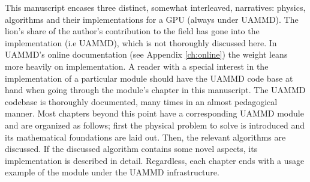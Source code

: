 \documentclass[ twoside,openright,titlepage,numbers=noenddot,%
headinclude,footinclude,cleardoublepage=empty,abstract=on,
BCOR=5mm,paper=b5,fontsize=11pt, dvipsnames
]{scrreprt}
\begin{document}
%
%
This manuscript encases three distinct, somewhat interleaved, narratives: physics, algorithms and their implementations for a GPU (always under UAMMD).
The lion's share of the author's contribution to the field has gone into the implementation (i.e UAMMD), which is not thoroughly discussed here. In UAMMD's online documentation (see Appendix \ref{ch:online}) the weight leans more heavily on implementation. A reader with a special interest in the implementation of a particular module should have the UAMMD code base at hand when going through the module's chapter in this manuscript. The UAMMD codebase is thoroughly documented, many times in an almost pedagogical manner.
Most chapters beyond this point have a corresponding UAMMD module and are organized as follows; first the physical problem to solve is introduced and its mathematical foundations are laid out. Then, the relevant algorithms are discussed. If the discussed algorithm contains some novel aspects, its implementation is described in detail. Regardless, each chapter ends with a usage example of the module under the UAMMD infrastructure.

\end{document}
